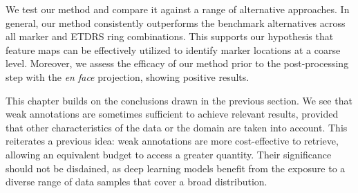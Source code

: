 We test our method and compare it against a range of alternative approaches. In general, our method consistently outperforms the benchmark alternatives across all marker and ETDRS ring combinations. This supports our hypothesis that feature maps can be effectively utilized to identify marker locations at a coarse level. Moreover, we assess the efficacy of our method prior to the post-processing step with the \textit{en face} projection, showing positive results.

This chapter builds on the conclusions drawn in the previous section. We see that weak annotations are sometimes sufficient to achieve relevant results, provided that other characteristics of the data or the domain are taken into account. This reiterates a previous idea: weak annotations are more cost-effective to retrieve, allowing an equivalent budget to access a greater quantity. Their significance should not be disdained, as deep learning models benefit from the exposure to a diverse range of data samples that cover a broad distribution.